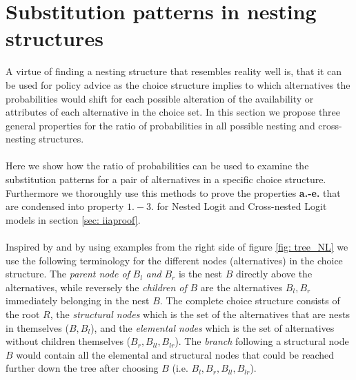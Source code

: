 
\FloatBarrier
\section{Substitution patterns in nesting structures}
\label{app:subst}
A virtue of finding a nesting structure that resembles reality well is, that it can be used for policy advice as the choice structure implies to which alternatives the probabilities would shift for each possible alteration of the availability or attributes of each alternative in the choice set. In this section we propose three general properties for the ratio of probabilities in all possible nesting and cross-nesting structures.
\\ \\
Here we show how the ratio of probabilities can be used to examine the substitution patterns for a pair of alternatives in a specific choice structure. Furthermore we thoroughly use this methods to prove the properties \textbf{a.-e.} that are condensed into property \textbf{$1.-3.$} for Nested Logit and Cross-nested Logit models in section \ref{sec: iiaproof}.
\\ \\
Inspired by \citet{bierlaire_overspecification_1997} and by using examples from the right side of figure \ref{fig: tree_NL} we use the following terminology for the different nodes (alternatives) in the choice structure. The \textit{parent node of} $B_l$ \textit{and} $B_r$ is the nest $B$ directly above the alternatives, while reversely the \textit{children of} $B$ are the alternatives $B_l,B_r$ immediately belonging in the nest $B$.
The complete choice structure consists of the root $R$,
the \textit{structural nodes} which is the set of the alternatives that are nests in themselves ($B,B_l$), and the \textit{elemental nodes} which is the set of alternatives without children themselves ($B_r,B_{ll},B_{lr}$). The \textit{branch} following a structural node $B$ would contain all the elemental and structural nodes that could be reached further down the tree after choosing $B$ (i.e. $B_l,B_r,B_{ll},B_{lr}$).
